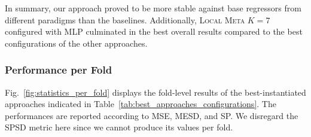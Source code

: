 \documentclass[runningheads]{llncs}
\begin{document}
\begin{table}[htbp]
	\centering
	\scriptsize
	\caption{Most promising approaches based on overall configuration performances. Green cells denote the best results.}
	\label{tab:best_approaches_configurations}
\end{table}

In summary, our approach proved to be more stable against base regressors from different paradigms than the baselines. Additionally, \textsc{Local Meta $K=7$} configured with MLP culminated in the best overall results compared to the best configurations of the other approaches. 


\subsubsection{Performance per Fold}

Fig.~\ref{fig:statistics_per_fold} displays the fold-level results of the best-instantiated approaches indicated in Table~\ref{tab:best_approaches_configurations}. The performances are reported according to MSE, MESD, and SP. We disregard the SPSD metric here since we cannot produce its values per fold.
\end{document}
